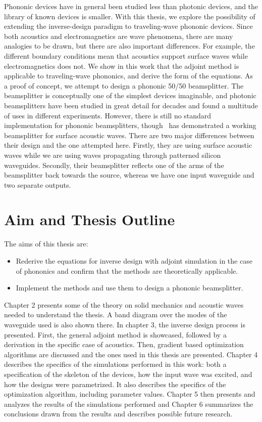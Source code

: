 Phononic devices have in general been studied less than photonic
devices, and the library of known devices is smaller.
With this thesis, we explore the possibility of extending the inverse-design paradigm to
traveling-wave phononic devices.
Since both acoustics and electromagnetics are wave phenomena, there are many
analogies to be drawn, but there are also important differences.
For example, the different boundary conditions mean that acoustics support surface waves
while electromagnetics does not.
We show in this work that the adjoint method is applicable to traveling-wave phononics,
and derive the form of the equations.
As a proof of concept, we attempt to design a phononic 50/50 beamsplitter.
The beamsplitter is conceptually one of the simplest devices imaginable,
and photonic beamsplitters have been studied in great detail for decades
and found a multitude of uses in different experiments.
However, there is still no standard implementation for phononic beamsplitters,
though~\cite{qiao2023developing} has demonstrated a working beamsplitter for
surface acoustic waves.
There are two major differences between their design and the one attempted here.
Firstly, they are using surface acoustic waves while we are using waves propagating
through patterned silicon waveguides.
Secondly, their beamsplitter reflects one of the arms of the beamsplitter back towards
the source, whereas we have one input waveguide and two separate outputs.

\section{Aim and Thesis Outline}

The aims of this thesis are:
\begin{itemize}
	\item Rederive the equations for inverse design with adjoint simulation in
		the case of phononics and confirm that the methods are theoretically
		applicable.
	\item Implement the methods and use them to design a phononic beamsplitter.
\end{itemize}

Chapter 2 presents some of the theory on solid mechanics and acoustic waves needed to
understand the thesis.
A band diagram over the modes of the waveguide used is also shown there.
In chapter 3, the inverse design process is presented.
First, the general adjoint method is showcased,
followed by a derivation in the specific case of acoustics.
Then, gradient based optimization algorithms are discussed and the ones used in
this thesis are presented.
Chapter 4 describes the specifics of the simulations performed in this work:
both a specification of the skeleton of the devices, how the input wave was excited,
and how the designs were parametrized. It also describes the specifics of the
optimization algorithm, including parameter values.
Chapter 5 then presents and analyzes the results of the simulations performed
and Chapter 6 summarizes the conclusions drawn from the results and describes
possible future research.
